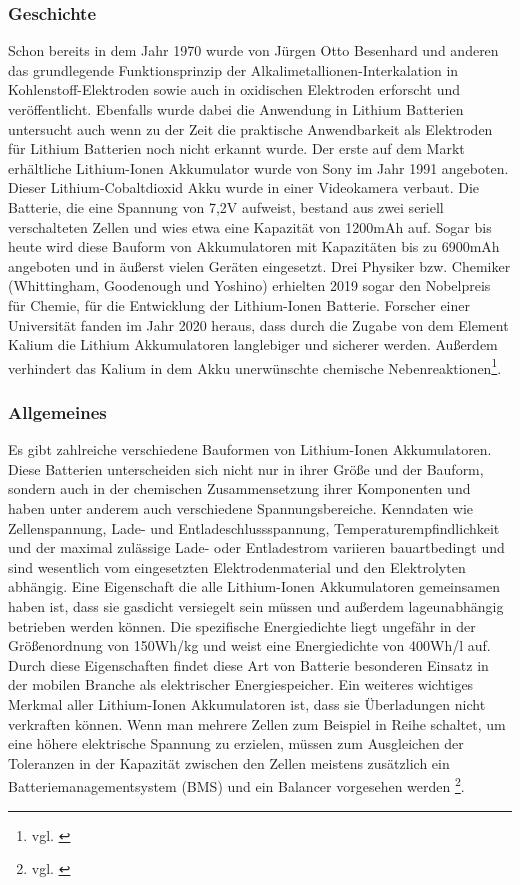 \subsubsection{Geschichte}
Schon bereits in dem Jahr 1970 wurde von Jürgen Otto Besenhard und anderen das grundlegende Funktionsprinzip der Alkalimetallionen-Interkalation in Kohlenstoff-Elektroden sowie auch in oxidischen Elektroden erforscht und veröffentlicht. Ebenfalls wurde dabei die Anwendung in Lithium Batterien untersucht auch wenn zu der Zeit die praktische Anwendbarkeit als Elektroden für Lithium Batterien noch nicht erkannt wurde. Der erste auf dem Markt erhältliche Lithium-Ionen Akkumulator wurde von Sony im Jahr 1991 angeboten. Dieser Lithium-Cobaltdioxid Akku wurde in einer Videokamera verbaut. Die Batterie, die eine Spannung von 7,2V aufweist, bestand aus zwei seriell verschalteten Zellen und wies etwa eine Kapazität von 1200mAh auf. Sogar bis heute wird diese Bauform von Akkumulatoren mit Kapazitäten
bis zu 6900mAh angeboten und in äußerst vielen Geräten eingesetzt. Drei Physiker bzw. Chemiker (Whittingham, Goodenough und Yoshino) erhielten 2019 sogar den Nobelpreis für Chemie, für die Entwicklung der Lithium-Ionen Batterie.
Forscher einer Universität fanden im Jahr 2020 heraus, dass durch die Zugabe von dem Element Kalium die Lithium Akkumulatoren langlebiger und sicherer werden. Außerdem verhindert das Kalium in dem Akku unerwünschte chemische Nebenreaktionen\footnote{vgl. \cite{Lithium-Ionen-Akkumulator Geschichte}}.

\subsubsection{Allgemeines}
Es gibt zahlreiche verschiedene Bauformen von Lithium-Ionen Akkumulatoren. Diese Batterien unterscheiden sich nicht nur in ihrer Größe und der Bauform, sondern auch in der chemischen Zusammensetzung ihrer Komponenten und haben unter anderem auch verschiedene Spannungsbereiche. Kenndaten wie Zellenspannung, Lade- und Entladeschlussspannung, Temperaturempfindlichkeit und der maximal zulässige Lade- oder Entladestrom variieren bauartbedingt und sind wesentlich vom eingesetzten Elektrodenmaterial und den Elektrolyten abhängig. Eine Eigenschaft die alle Lithium-Ionen Akkumulatoren gemeinsamen haben ist, dass sie gasdicht versiegelt sein müssen und außerdem lageunabhängig betrieben werden können. Die spezifische Energiedichte liegt ungefähr in der Größenordnung von 150Wh/kg und weist eine Energiedichte von 400Wh/l auf. Durch diese Eigenschaften findet diese Art von Batterie besonderen Einsatz in der mobilen Branche als elektrischer Energiespeicher. Ein weiteres wichtiges Merkmal aller Lithium-Ionen Akkumulatoren ist, dass sie Überladungen nicht verkraften können. Wenn man mehrere Zellen zum Beispiel in Reihe schaltet, um eine höhere elektrische Spannung zu erzielen, müssen zum Ausgleichen der Toleranzen in der Kapazität zwischen den Zellen meistens zusätzlich ein Batteriemanagementsystem (BMS) und ein Balancer vorgesehen werden \footnote{vgl. \cite{Lithium-Ionen-Akkumulator Allgemeines}}.
\newpage

